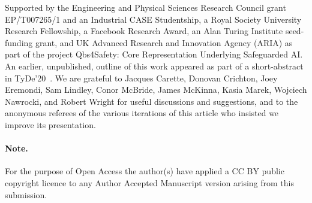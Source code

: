 \documentclass[acmsmall]{acmart}
\begin{document}
\FloatBarrier
\begin{acks}                            %
%
  Supported by the Engineering and Physical Sciences Research Council
  grant EP/T007265/1 and an Industrial CASE Studentship, a Royal
  Society University Research Fellowship, a Facebook Research Award,
  an Alan Turing Institute seed-funding grant, and UK Advanced
  Research and Innovation Agency (ARIA) as part of the project
  Qbs4Safety: Core Representation Underlying Safeguarded AI. An
  earlier, unpublished, outline of this work appeared as part of a
  short-abstract in TyDe'20~\cite{frex:tyde}.
%
  We are grateful to
  Jacques Carette,   %
  Donovan Crichton,  %
  Joey Eremondi,     %
  Sam Lindley,       %
  Conor McBride,     %
  James McKinna,     %
  Kasia Marek,       %
  Wojciech Nawrocki, %
  and                %
  Robert Wright      %
%
  for useful discussions and suggestions,
  and to the anonymous referees of the various iterations of this article who
  insisted we improve its presentation.
\end{acks}
\paragraph{Note.}
  For the purpose of Open Access the author(s) have applied a CC BY public
  copyright licence to any Author Accepted Manuscript version arising
  from this submission.



\end{document}
